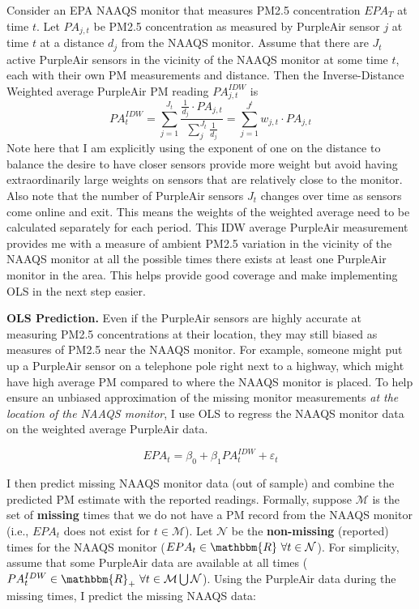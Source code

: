 \documentclass[12pt]{article}
\begin{document}
Consider an EPA NAAQS monitor that measures PM2.5 concentration $EPA_T$ at time $t$. Let $PA_{j,t}$ be PM2.5 concentration as measured by PurpleAir sensor $j$ at time $t$ at a distance $d_j$ from the NAAQS monitor. Assume that there are $J_t$ active PurpleAir sensors in the vicinity of the NAAQS monitor at some time $t$, each with their own PM measurements and distance. Then the Inverse-Distance Weighted average PurpleAir PM reading $PA^{IDW}_{j,t}$ is
\begin{equation}
    PA^{IDW}_t= \sum\limits_{j=1}^{J_t} \dfrac{\frac{1}{d_j}\cdot PA_{j,t}}{\sum\limits_j^{J_t}\frac{1}{d_j}}
    = \sum\limits_{j=1}^{J^t} w_{j,t}\cdot PA_{j,t}
\end{equation}
Note here that I am explicitly using the exponent of one on the distance to balance the desire to have closer sensors provide more weight but avoid having extraordinarily large weights on sensors that are relatively close to the monitor. Also note that the number of PurpleAir sensors $J_t$ changes over time as sensors come online and exit. This means the weights of the weighted average need to be calculated separately for each period. This IDW average PurpleAir measurement provides me with a measure of ambient PM2.5 variation in the vicinity of the NAAQS monitor at all the possible times there exists at least one PurpleAir monitor in the area. This helps provide good coverage and make implementing OLS in the next step easier. 

\textbf{OLS Prediction.} Even if the PurpleAir sensors are highly accurate at measuring PM2.5 concentrations at their location, they may still biased as measures of PM2.5 near the NAAQS monitor. For example, someone might put up a PurpleAir sensor on a telephone pole right next to a highway, which might have high average PM compared to where the NAAQS monitor is placed. To help ensure an unbiased approximation of the missing monitor measurements \textit{at the location of the NAAQS monitor}, I use OLS to regress the NAAQS monitor data on the weighted average PurpleAir data.

\begin{equation}
EPA_t = \beta_0 + \beta_1 PA^{IDW}_t + \varepsilon_t
\end{equation}

\def\M{\mathcal{M}}\def\N{\mathcal{N}}\def\R{\mathbbm{R}}
\def\up{\widehat{EPA}^U_t} \def\low{\widehat{EPA}^L_t}
I then predict missing NAAQS monitor data (out of sample) and combine the predicted PM estimate with the reported readings. Formally, suppose $\M$ is the set of \textbf{missing} times that we do not have a PM record from the NAAQS monitor (i.e., $EPA_t$ does not exist for $t\in\M$). Let $\N$ be the \textbf{non-missing} (reported) times for the NAAQS monitor ($EPA_t\in\R\ \forall t\in\N$). For simplicity, assume that some PurpleAir data are available at all times ($PA^{IDW}_t\in\R_+\ \forall t\in\M\bigcup\N$). Using the PurpleAir data during the missing times, I predict the missing NAAQS data:
\end{document}
